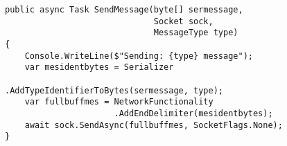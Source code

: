 \begin{figure}[h]
	\centering
	\begin{lstlisting}[label = code:asyncawaitex, caption=Example of async/await workflow, captionpos=b, basicstyle=\scriptsize]
public async Task SendMessage(byte[] sermessage, 
                              Socket sock, 
                              MessageType type)
{
    Console.WriteLine($"Sending: {type} message");
    var mesidentbytes = Serializer
                        .AddTypeIdentifierToBytes(sermessage, type);
    var fullbuffmes = NetworkFunctionality
                      .AddEndDelimiter(mesidentbytes);
    await sock.SendAsync(fullbuffmes, SocketFlags.None);
}


	\end{lstlisting}
\end{figure}


%
